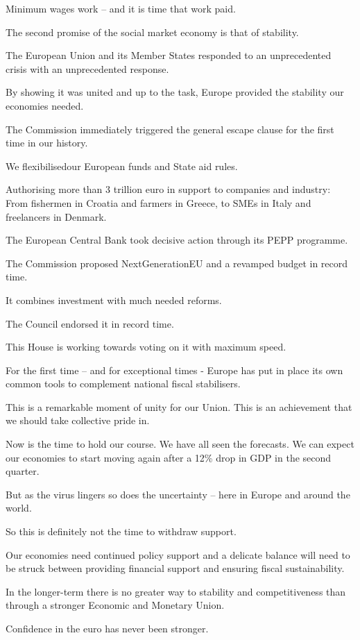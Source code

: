 \documentclass[a4paper,11pt]{article}
\begin{document}
Minimum wages work – and it is time that work paid.

The second promise of the social market economy is that of stability.

The European Union and its Member States responded to an unprecedented crisis with an unprecedented response.

By showing it was united and up to the task, Europe provided the stability our economies needed.

The Commission immediately triggered the general escape clause for the first time in our history.

We flexibilisedour European funds and State aid rules.

Authorising more than 3 trillion euro in support to companies and industry: From fishermen in Croatia and farmers in Greece, to SMEs in Italy and freelancers in Denmark.

The European Central Bank took decisive action through its PEPP programme.

The Commission proposed NextGenerationEU and a revamped budget in record time.

It combines investment with much needed reforms.

The Council endorsed it in record time.

This House is working towards voting on it with maximum speed.

For the first time – and for exceptional times - Europe has put in place its own common tools to complement national fiscal stabilisers.

This is a remarkable moment of unity for our Union. This is an achievement that we should take collective pride in.

Now is the time to hold our course.  We have all seen the forecasts. We can expect our economies to start moving again after a 12\% drop in GDP in the second quarter.

But as the virus lingers so does the uncertainty – here in Europe and around the world.  

So this is definitely not the time to withdraw support.

Our economies need continued policy support and a delicate balance will need to be struck between providing financial support and ensuring fiscal sustainability.

In the longer-term there is no greater way to stability and competitiveness than through a stronger Economic and Monetary Union.

Confidence in the euro has never been stronger.                                           
\end{document}
